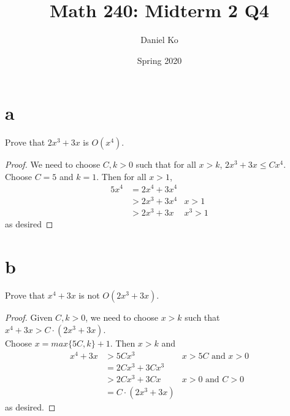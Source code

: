 \documentclass[11pt]{scrartcl}
\title{Math 240: Midterm 2 Q4}
\author{Daniel Ko}
\date{Spring 2020}
\begin{document}
\maketitle

\section{a}
Prove that $2x^3 + 3x$ is $O(x^4)$.
\begin{proof}
	We need to choose $C, k > 0$ such that for all $x > k$, $2x^3 + 3x \leq Cx^4$.\\
	Choose $C = 5$ and $k = 1$. Then for all $x > 1$,
	\begin{align*}
		5x^4 & = 2x^4 + 3x^4         \\
		     & > 2x^3 + 3x^4 & x > 1 \\
		     & > 2x^3 + 3x   & x^3 > 1
	\end{align*}
	as desired
\end{proof}


\section{b}
Prove that $x^4 + 3x$ is not $O(2x^3 + 3x)$.
\begin{proof}
	Given $C, k > 0$, we need to choose $x > k$ such that $x^4 + 3x > C \cdot (2x^3 + 3x)$.\\
	Choose $x = max\{5C, k\} + 1$. Then $x > k$ and
	\begin{align*}
		x^4 + 3x & > 5Cx^3 & x > 5C  \text{ and } x > 0\\
		& = 2Cx^3 + 3Cx^3 \\ 
		& > 2Cx^3 + 3Cx & x > 0 \text{ and } C > 0\\
		& = C \cdot (2x^3 + 3x)
	\end{align*}
	as desired.
\end{proof}
\end{document}
